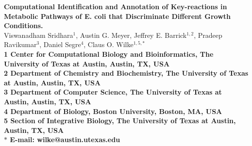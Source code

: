 \documentclass[12pt]{article}
\date{}
\begin{document}
\begin{flushleft}
{\Large
\textbf{Computational Identification and Annotation of Key-reactions in Metabolic Pathways of E. coli that Discriminate Different Growth Conditions.}
}
\bigskip
\noindent
\\
Viswanadham Sridhara$^{1}$,
Austin G. Meyer, 
Jeffrey E. Barrick$^{1,2}$,
Pradeep Ravikumar$^{3}$,
Daniel Segre$^{4}$, 
Claus O. Wilke$^{1,5,\ast}$
\\
\bigskip
\bf{1} Center for Computational Biology and Bioinformatics, The University of Texas at Austin, Austin, TX, USA
\\
\bf{2} Department of Chemistry and Biochemistry, The University of Texas at Austin, Austin, TX, USA
\\
\bf{3} Department of Computer Science, The University of Texas at Austin, Austin, TX, USA
\\
\bf{4} Department of Biology, Boston University, Boston, MA, USA
\\
\bf{5} Section of Integrative Biology, The University of Texas at Austin, Austin, TX, USA
\\
\bigskip
$\ast$ E-mail: wilke@austin.utexas.edu
\end{flushleft}
\newpage
\end{document}
